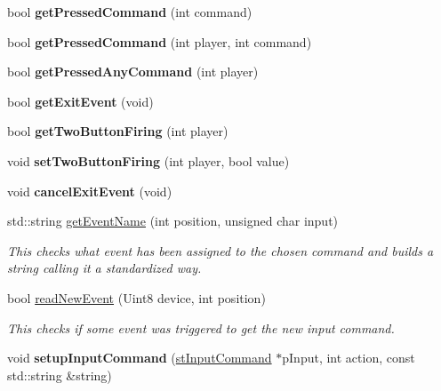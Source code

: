 \begin{DoxyCompactItemize}
\item 
\hypertarget{class_c_input_ae1219c4d90e4ad66ba4ccd4dff5603d9}{
bool {\bfseries getPressedCommand} (int command)}
\label{class_c_input_ae1219c4d90e4ad66ba4ccd4dff5603d9}

\item 
\hypertarget{class_c_input_a9385d389edb4aa02f6095f4afbb7ef67}{
bool {\bfseries getPressedCommand} (int player, int command)}
\label{class_c_input_a9385d389edb4aa02f6095f4afbb7ef67}

\item 
\hypertarget{class_c_input_abb73d486fd0e8245942be72c521f191c}{
bool {\bfseries getPressedAnyCommand} (int player)}
\label{class_c_input_abb73d486fd0e8245942be72c521f191c}

\item 
\hypertarget{class_c_input_a1a7b3e20613a6c104b7897df528f624b}{
bool {\bfseries getExitEvent} (void)}
\label{class_c_input_a1a7b3e20613a6c104b7897df528f624b}

\item 
\hypertarget{class_c_input_a9f6b3efb6f88d0f9787e775b0d77d881}{
bool {\bfseries getTwoButtonFiring} (int player)}
\label{class_c_input_a9f6b3efb6f88d0f9787e775b0d77d881}

\item 
\hypertarget{class_c_input_a1872fc12e86be8dd9bb4f2fbaa90b633}{
void {\bfseries setTwoButtonFiring} (int player, bool value)}
\label{class_c_input_a1872fc12e86be8dd9bb4f2fbaa90b633}

\item 
\hypertarget{class_c_input_ad2f17691e8b7e0c977ac20a0ef4ebdda}{
void {\bfseries cancelExitEvent} (void)}
\label{class_c_input_ad2f17691e8b7e0c977ac20a0ef4ebdda}

\item 
std::string \hyperlink{class_c_input_a9ec7be50e43345a0c70b9379fe092c16}{getEventName} (int position, unsigned char input)
\begin{DoxyCompactList}\small\item\em This checks what event has been assigned to the chosen command and builds a string calling it a standardized way. \item\end{DoxyCompactList}\item 
bool \hyperlink{class_c_input_a277812473d6522fdb00b7a584440c0a7}{readNewEvent} (Uint8 device, int position)
\begin{DoxyCompactList}\small\item\em This checks if some event was triggered to get the new input command. \item\end{DoxyCompactList}\item 
\hypertarget{class_c_input_af6e2e781b78d4258ba8b1206087f54fa}{
void {\bfseries setupInputCommand} (\hyperlink{structst_input_command}{stInputCommand} $\ast$pInput, int action, const std::string \&string)}
\label{class_c_input_af6e2e781b78d4258ba8b1206087f54fa}


\end{DoxyCompactItemize}
